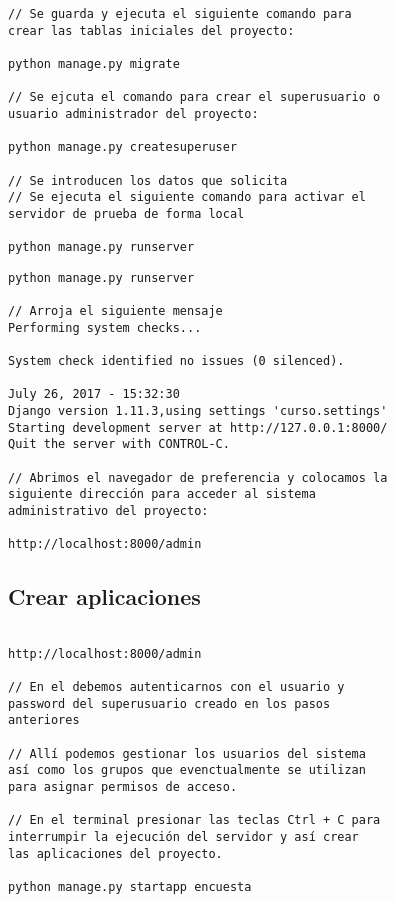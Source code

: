 \documentclass[xcolor=dvipsnames]{beamer}
\begin{document}
\begin{frame}[fragile]
\begin{verbatim}
// Se guarda y ejecuta el siguiente comando para
crear las tablas iniciales del proyecto:

python manage.py migrate

// Se ejcuta el comando para crear el superusuario o 
usuario administrador del proyecto:

python manage.py createsuperuser

// Se introducen los datos que solicita
// Se ejecuta el siguiente comando para activar el 
servidor de prueba de forma local

python manage.py runserver
\end{verbatim}
\end{frame}

\begin{frame}[fragile]
\begin{verbatim}
python manage.py runserver

// Arroja el siguiente mensaje
Performing system checks...

System check identified no issues (0 silenced).

July 26, 2017 - 15:32:30
Django version 1.11.3,using settings 'curso.settings'
Starting development server at http://127.0.0.1:8000/
Quit the server with CONTROL-C.

// Abrimos el navegador de preferencia y colocamos la
siguiente dirección para acceder al sistema
administrativo del proyecto:

http://localhost:8000/admin
\end{verbatim}
\end{frame}

\subsection{Crear aplicaciones}
\begin{frame}[fragile]
\begin{verbatim}

http://localhost:8000/admin

// En el debemos autenticarnos con el usuario y
password del superusuario creado en los pasos
anteriores

// Allí podemos gestionar los usuarios del sistema
así como los grupos que evenctualmente se utilizan 
para asignar permisos de acceso.

// En el terminal presionar las teclas Ctrl + C para
interrumpir la ejecución del servidor y así crear 
las aplicaciones del proyecto.

python manage.py startapp encuesta

\end{verbatim}
\end{frame}
\end{document}
